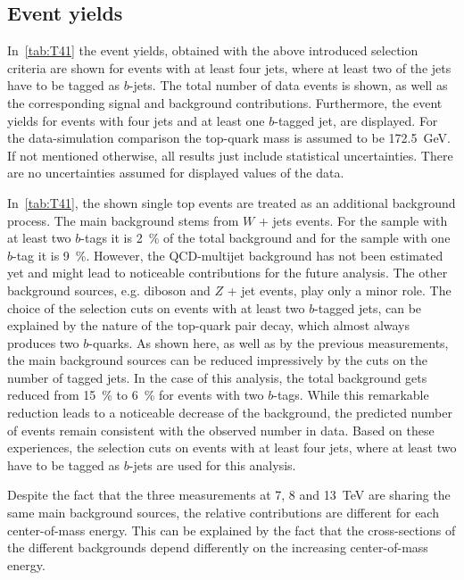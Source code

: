 \subsection{Event yields}

In~\cref{tab:T41} the event yields, obtained with the above introduced selection criteria are shown for events with at least four jets, where at least two of the jets have to be tagged as $b$-jets. The total number of data events is shown, as well as the corresponding signal and background contributions. Furthermore, the event yields for events with four jets and at least one $b$-tagged jet, are displayed. 
For the data-simulation comparison the top-quark mass is assumed to be 172.5~GeV. If not mentioned otherwise, all results just include statistical uncertainties. There are no uncertainties assumed for displayed values of the data. 

In~\cref{tab:T41}, the shown single top events are treated as an additional background process.
The main background stems from $W$ + jets events. For the sample with at least two $b$-tags it is  2~\% of the total background and for the sample with one $b$-tag it is 9~\%. However, the QCD-multijet background has not been estimated yet and might lead to noticeable contributions for the future analysis. The other background sources, e.g.  diboson  and $Z$ + jet events, play only a minor role. 
The choice of the selection cuts on events with at least two $b$-tagged jets, can be explained by the nature of the top-quark pair decay, which almost always produces two $b$-quarks.  As shown here, as well as by the previous measurements, the main background sources can be reduced impressively by the cuts on the number of tagged jets. In the  case of this analysis, the total background gets reduced from  15~\% to 6~\% for events with two  $b$-tags. While this remarkable reduction leads to a noticeable decrease of the background, the predicted number of events remain consistent with the observed number in data. Based on these experiences, the selection cuts on events with at least four jets, where at least two have to be tagged as $b$-jets are used for this analysis.

Despite the fact that the three measurements at 7, 8 and 13~TeV are sharing the same main background sources, the relative contributions are different for each center-of-mass energy. This can be explained by the fact that the cross-sections of the different backgrounds depend differently on the increasing center-of-mass energy.
\vspace{0.5cm}

\vspace{1.0cm}

